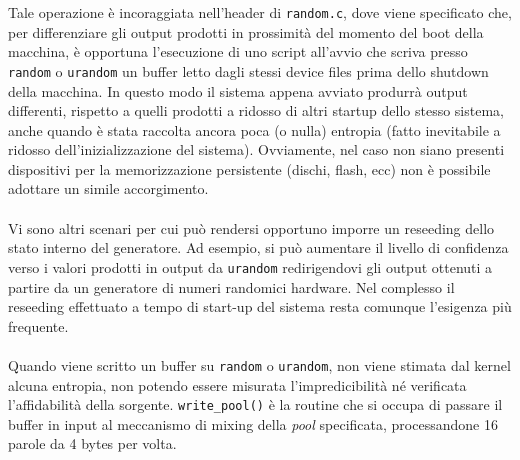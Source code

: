 \documentclass{article}
\begin{document}
 
 Tale operazione è incoraggiata nell'header di
 \verb+random.c+, dove viene specificato che, per differenziare gli output
 prodotti in prossimità del momento del boot della macchina, è opportuna
 l'esecuzione di uno script all'avvio che scriva presso \verb+random+ o
 \verb+urandom+ un buffer letto dagli stessi device files prima dello shutdown
 della macchina. In questo modo il sistema appena avviato produrrà output
 differenti, rispetto a quelli prodotti a ridosso di altri startup dello stesso
 sistema, anche quando è stata raccolta ancora poca (o nulla) entropia
 (fatto inevitabile a ridosso dell'inizializzazione del sistema).
 Ovviamente, nel caso non siano presenti dispositivi per la memorizzazione
 persistente (dischi, flash, ecc) non è possibile adottare un simile
 accorgimento.
 \paragraph{} Vi sono altri scenari per cui può rendersi opportuno imporre
 un reseeding dello stato interno del generatore. Ad esempio, si può aumentare
 il livello di confidenza verso i valori prodotti in output da \verb+urandom+
 redirigendovi gli output ottenuti a partire da un generatore di numeri
 randomici hardware. Nel complesso il reseeding effettuato a tempo di start-up
 del sistema resta comunque l'esigenza più frequente.
 \paragraph{}Quando viene scritto un buffer su \verb+random+ o \verb+urandom+,
 non viene stimata dal kernel alcuna entropia, non potendo essere misurata
 l'impredicibilità né verificata l'affidabilità della sorgente.
 \newline \verb+write_pool()+ è la routine che si occupa di passare il buffer in
 input al meccanismo di mixing della \emph{pool} specificata, processandone 16 parole
 da 4 bytes per volta.
 

 
\end{document}
